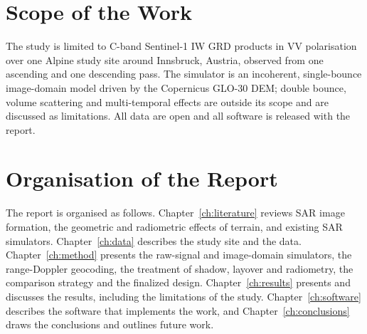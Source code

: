 \section{Scope of the Work}
The study is limited to C-band Sentinel-1 IW GRD products in VV polarisation over one Alpine study site around
Innsbruck, Austria, observed from one ascending and one descending pass. The simulator is an incoherent, single-bounce
image-domain model driven by the Copernicus GLO-30 DEM; double bounce, volume scattering and multi-temporal effects are
outside its scope and are discussed as limitations. All data are open and all software is released with the report.

\section{Organisation of the Report}
The report is organised as follows. Chapter~\ref{ch:literature} reviews SAR image formation, the geometric and
radiometric effects of terrain, and existing SAR simulators. Chapter~\ref{ch:data} describes the study site and the
data. Chapter~\ref{ch:method} presents the raw-signal and image-domain simulators, the range-Doppler geocoding, the
treatment of shadow, layover and radiometry, the comparison strategy and the finalized design.
Chapter~\ref{ch:results} presents and discusses the results, including the limitations of the study.
Chapter~\ref{ch:software} describes the software that implements the work, and Chapter~\ref{ch:conclusions} draws the
conclusions and outlines future work.
